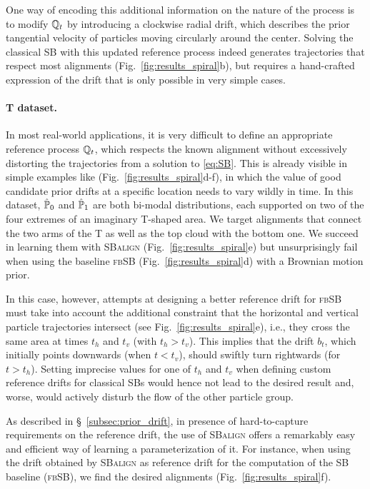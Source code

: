 One way of encoding this additional information on the nature of the process is to modify $\mathbb{Q}_{ t }$ by introducing a clockwise radial drift, which describes the prior tangential velocity of particles moving circularly around the center.
Solving the classical SB with this updated reference process indeed generates trajectories that respect most alignments (Fig.~\ref{fig:results_spiral}b), but requires a hand-crafted expression of the drift that is only possible in very simple cases.

\paragraph{T dataset.}
In most real-world applications, it is very difficult to define an appropriate reference process $\mathbb{Q}_{ t }$, which respects the known alignment without excessively distorting the trajectories from a solution to \eqref{eq:SB}. This is already visible in simple examples like (Fig.~\ref{fig:results_spiral}d-f), in which the value of good candidate prior drifts at a specific location needs to vary wildly in time.
In this dataset, $\hat{\mathbb{P}}_{ {0} }$ and $\hat{\mathbb{P}}_{ {1}}$ are both bi-modal distributions, each supported on two of the four extremes of an imaginary T-shaped area.
We target alignments that connect the two arms of the T as well as the top cloud with the bottom one. We succeed in learning them with \textsc{SBalign} (Fig.~\ref{fig:results_spiral}e) but unsurprisingly fail when using the baseline \textsc{fbSB} (Fig.~\ref{fig:results_spiral}d) with a Brownian motion prior.

 In this case, however, attempts at designing a better reference drift for \textsc{fbSB} must take into account the additional constraint that the horizontal and vertical particle trajectories intersect (see Fig.~\ref{fig:results_spiral}e), i.e., they cross the same area at times $t_h$ and $t_v$ (with $t_h > t_v$). This implies that the drift $b_t$, which initially points downwards (when $t < t_v$), should swiftly turn rightwards (for $t > t_h$).
Setting imprecise values for one of $t_h$ and $t_v$ when defining custom reference drifts for classical SBs would hence not lead to the desired result and, worse, would actively disturb the flow of the other particle group.

 As described in \S~\ref{subsec:prior_drift}, in presence of hard-to-capture requirements on the reference drift, the use of \textsc{SBalign} offers a remarkably easy and efficient way of learning a parameterization of it. For instance, when using the drift obtained by \textsc{SBalign} as reference drift for the computation of the SB baseline (\textsc{fbSB}), we find the desired alignments (Fig.~\ref{fig:results_spiral}f).


